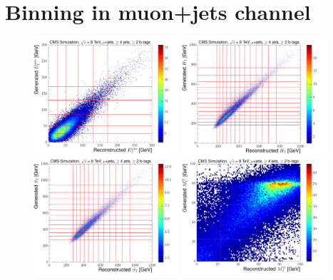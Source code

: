 \section{Binning in muon+jets channel}
\label{as:binning_muon}

\begin{figure}[hbtp]
    \centering
     \includegraphics[width=0.48\textwidth]{Chapters/04_Analysis/04b_XSections/images/binning/muon_MET_8TeV.pdf}\hfill
     \includegraphics[width=0.48\textwidth]{Chapters/04_Analysis/04b_XSections/images/binning/muon_HT_8TeV.pdf}\\
     \includegraphics[width=0.48\textwidth]{Chapters/04_Analysis/04b_XSections/images/binning/muon_ST_8TeV.pdf}\hfill
     \includegraphics[width=0.48\textwidth]{Chapters/04_Analysis/04b_XSections/images/binning/muon_MT_8TeV.pdf}\\

\end{figure}
